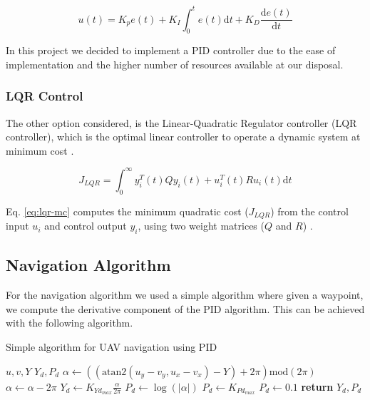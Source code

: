 \begin{equation}
	u(t) = K_p e(t) + K_I \int^t_0 e(t) \mathrm{d} t + K_D \frac{\mathrm{d} e(t)}{\mathrm{d}t}
	\label{eq:pid-u}
\end{equation}

In this project we decided to implement a PID controller due to the ease of implementation and the 
higher number of resources available at our disposal.

\subsubsection{LQR Control}

The other option considered, is the Linear-Quadratic Regulator controller (LQR controller), which is the 
optimal linear controller to operate a dynamic system at minimum cost \autocite{NH20}.

\begin{equation}
	J_{LQR} = \int^\infty_0 y_i^T(t) Q y_i (t) + u_i^T (t) R u_i (t) \mathrm{d}t
	\label{eq:lqr-mc}
\end{equation}

Eq. \ref{eq:lqr-mc} computes the minimum quadratic cost ($J_{LQR}$) from the control input $u_i$ and control
output $y_i$, using two weight matrices ($Q$ and $R$) \autocite{NH20}.

\subsection{Navigation Algorithm}

For the navigation algorithm we used a simple algorithm where given a waypoint, we compute the 
derivative component of the PID algorithm. This can be achieved with the following algorithm.

\newpage

\begin{algorithm}
	\algrenewcommand{}
	\algrenewcommand{}
	\caption{Simple algorithm for UAV navigation using PID}\label{alg:nav}
	\begin{algorithmic}[1]
		\Require $u, v, Y$
		\Ensure $Y_d, P_d$
		\State $\alpha \gets ((\mathrm{atan2}(u_y - v_y, u_x - v_x) - Y) + 2 \pi) \mathrm{mod} (2 \pi)$
		\If{$\alpha > \pi$ }
		\State $\alpha \gets \alpha - 2 \pi$
		\EndIf
		\State $Y_d \gets K_{Yd_{max}} \frac{\alpha}{2\pi}$
		\State $P_d \gets \log(|\alpha|)$
		\State $P_d \gets K_{Pd_{max}}$
		\State $P_d \gets 0.1$
		\EndIf
		\State \textbf{return} $Y_d, P_d$
	\end{algorithmic}
\end{algorithm}


